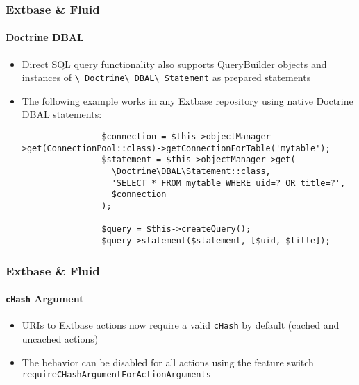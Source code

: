 \begin{frame}[fragile]
	\frametitle{Extbase \& Fluid}
	\framesubtitle{Doctrine DBAL}

	\lstset{basicstyle=\tiny\ttfamily}

	\begin{itemize}
		\item Direct SQL query functionality also supports QueryBuilder objects and instances of
			\texttt{\textbackslash
			Doctrine\textbackslash
			DBAL\textbackslash
			Statement} as prepared statements
		\item The following example works in any Extbase repository using native Doctrine DBAL statements:

			\begin{lstlisting}
				$connection = $this->objectManager->get(ConnectionPool::class)->getConnectionForTable('mytable');
				$statement = $this->objectManager->get(
				  \Doctrine\DBAL\Statement::class,
				  'SELECT * FROM mytable WHERE uid=? OR title=?',
				  $connection
				);

				$query = $this->createQuery();
				$query->statement($statement, [$uid, $title]);
			\end{lstlisting}
	\end{itemize}

\end{frame}

\begin{frame}[fragile]
	\frametitle{Extbase \& Fluid}
	\framesubtitle{\texttt{cHash} Argument}

	\begin{itemize}
		\item URIs to Extbase actions now require a valid \texttt{cHash} by default\newline
			(cached and uncached actions)
		\item The behavior can be disabled for all actions using the feature switch
			\texttt{requireCHashArgumentForActionArguments}
	\end{itemize}

\end{frame}

